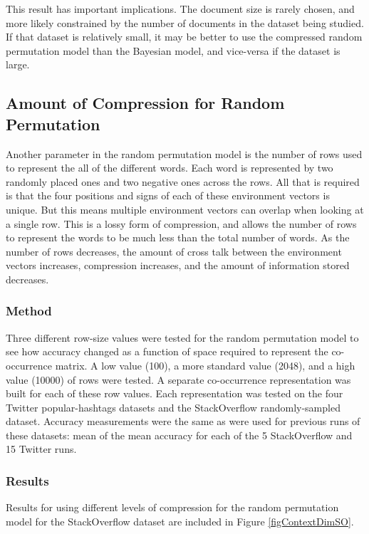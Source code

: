 \documentclass[man,floatsintext,donotrepeattitle]{apa6}
\begin{document}
This result has important implications.
The document size is rarely chosen, and more likely constrained by the number of documents in the dataset being studied.
If that dataset is relatively small, it may be better to use the compressed random permutation model than the Bayesian model, and vice-versa if the dataset is large.

\subsection{Amount of Compression for Random Permutation}

Another parameter in the random permutation model is the number of rows used to represent the all of the different words.
Each word is represented by two randomly placed ones and two negative ones across the rows.
All that is required is that the four positions and signs of each of these environment vectors is unique.
But this means multiple environment vectors can overlap when looking at a single row.
This is a lossy form of compression, and allows the number of rows to represent the words to be much less than the total number of words.
As the number of rows decreases, the amount of cross talk between the environment vectors increases, compression increases, and the amount of information stored decreases.

\subsubsection{Method}

Three different row-size values were tested for the random permutation model to see how accuracy changed as a function of space required to represent the co-occurrence matrix.
A low value (\num{100}), a more standard value (\num{2048}), and a high value (\num{10000}) of rows were tested.
A separate co-occurrence representation was built for each of these row values.
Each representation was tested on the four Twitter popular-hashtags datasets and the StackOverflow randomly-sampled dataset.
Accuracy measurements were the same as were used for previous runs of these datasets: mean of the mean accuracy for each of the 5 StackOverflow and 15 Twitter runs.

\subsubsection{Results}

Results for using different levels of compression for the random permutation model for the StackOverflow dataset are included in Figure \ref{figContextDimSO}.
\end{document}
